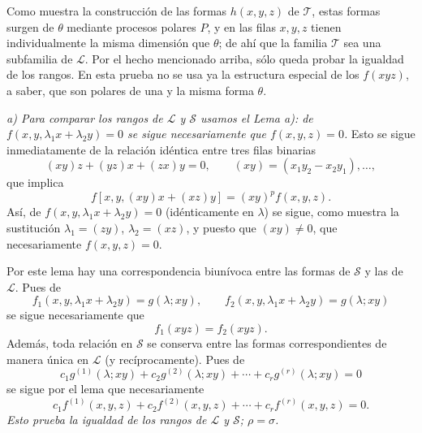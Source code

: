 \documentclass[11pt]{article}
\begin{document}
Como muestra la construcción de las formas $h(x,y,z)$ de $\mathcal T$, estas formas surgen de $\theta$ mediante procesos polares $P$, y en las filas $x,y,z$ tienen individualmente la misma dimensión que $\theta$; de ahí que la familia $\mathcal T$ sea una subfamilia de $\mathcal L$. Por el hecho mencionado arriba, sólo queda probar la igualdad de los rangos. En esta prueba no se usa ya la estructura especial de los $f(xyz)$, a saber, que son polares de una y la misma forma $\theta$.

\emph{a) Para comparar los rangos de $\mathcal L$ y $\mathcal S$ usamos el Lema a): de $f(x,y,\lambda_1x+\lambda_2y)=0$ se sigue necesariamente que $f(x,y,z)=0$.} Esto se sigue inmediatamente de la relación idéntica entre tres filas binarias
\[
  (xy)z+(yz)x+(zx)y=0,
  \qquad (xy)=(x_1y_2-x_2y_1),\ldots,
\]
que implica
\[
  f[x,y,(xy)x+(xz)y]=(xy)^p f(x,y,z).
\]
Así, de $f(x,y,\lambda_1x+\lambda_2y)=0$ (idénticamente en $\lambda$) se sigue, como muestra la sustitución $\lambda_1=(zy)$, $\lambda_2=(xz)$, y puesto que $(xy)\ne0$, que necesariamente $f(x,y,z)=0$.

Por este lema hay una correspondencia biunívoca entre las formas de $\mathcal S$ y las de $\mathcal L$. Pues de
\[
  f_1(x,y,\lambda_1x+\lambda_2y)=g(\lambda;xy),\qquad
  f_2(x,y,\lambda_1x+\lambda_2y)=g(\lambda;xy)
\]
se sigue necesariamente que
\[
  f_1(xyz)=f_2(xyz).
\]
Además, toda relación en $\mathcal S$ se conserva entre las formas correspondientes de manera única en $\mathcal L$ (y recíprocamente). Pues de
\[
  c_1g^{(1)}(\lambda;xy)+c_2g^{(2)}(\lambda;xy)+\cdots+c_rg^{(r)}(\lambda;xy)=0
\]
se sigue por el lema que necesariamente
\[
  c_1f^{(1)}(x,y,z)+c_2f^{(2)}(x,y,z)+\cdots+c_rf^{(r)}(x,y,z)=0.
\]
\emph{Esto prueba la igualdad de los rangos de $\mathcal L$ y $\mathcal S$; $\rho=\sigma$.}
\end{document}
